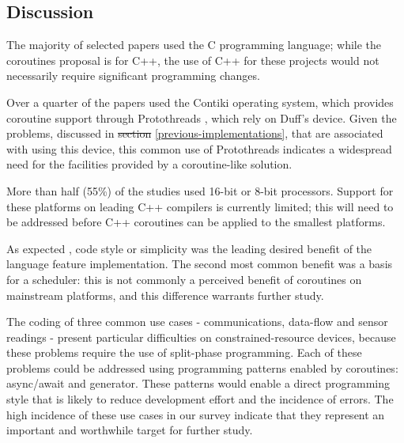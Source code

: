 \documentclass[format=acmsmall, review=false, screen=false]{acmart}
\providecommand{\DIFadd}[1]{{\protect\color{blue}\uwave{#1}}} %
\providecommand{\DIFdel}[1]{{\protect\color{red}\sout{#1}}}                      %
\providecommand{\DIFaddbegin}{} %
\providecommand{\DIFaddend}{} %
\providecommand{\DIFdelbegin}{} %
\providecommand{\DIFdelend}{} %
\newcommand{\DIFscaledelfig}{0.5}
\newlength{\DIFdelgraphicswidth} %
\newlength{\DIFdelgraphicsheight} %
\newcommand{\DIFaddincludegraphics}[2][]{{\color{blue}\fbox{\DIFOincludegraphics[#1]{#2}}}} %
\newcommand{\DIFdelincludegraphics}[2][]{%
\sbox{\DIFdelgraphicsbox}{\DIFOincludegraphics[#1]{#2}}%
\settoboxwidth{\DIFdelgraphicswidth}{\DIFdelgraphicsbox} %
\settoboxtotalheight{\DIFdelgraphicsheight}{\DIFdelgraphicsbox} %
\scalebox{\DIFscaledelfig}{%
\parbox[b]{\DIFdelgraphicswidth}{\usebox{\DIFdelgraphicsbox}\\[-\baselineskip] \rule{\DIFdelgraphicswidth}{0em}}\llap{\resizebox{\DIFdelgraphicswidth}{\DIFdelgraphicsheight}{%
\setlength{\unitlength}{\DIFdelgraphicswidth}%
\begin{picture}(1,1)%
\thicklines\linethickness{2pt} %
{\color[rgb]{1,0,0}\put(0,0){\framebox(1,1){}}}%
{\color[rgb]{1,0,0}\put(0,0){\line( 1,1){1}}}%
{\color[rgb]{1,0,0}\put(0,1){\line(1,-1){1}}}%
\end{picture}%
}\hspace*{3pt}}} %
} %
\DeclareRobustCommand{\DIFaddbegin}{\DIFOaddbegin \let\includegraphics\DIFaddincludegraphics} %
\DeclareRobustCommand{\DIFaddend}{\DIFOaddend \let\includegraphics\DIFOincludegraphics} %
\DeclareRobustCommand{\DIFdelbegin}{\DIFOdelbegin \let\includegraphics\DIFdelincludegraphics} %
\DeclareRobustCommand{\DIFdelend}{\DIFOaddend \let\includegraphics\DIFOincludegraphics} %
\begin{document}
\subsection{Discussion}

The majority of selected papers used the C programming language; while the coroutines proposal \cite{ISO2017} is for C++, the use of C++ for these projects would not necessarily require significant programming changes.

Over a quarter of the papers used the Contiki \cite{Dunkels2004} operating system, which provides coroutine support through Protothreads \cite{Dunkels2006}, which rely on Duff’s device. Given the problems, discussed in \DIFdelbegin \DIFdel{section }\DIFdelend \DIFaddbegin \DIFadd{Section }\DIFaddend \ref{previous-implementations}, that are associated with using this device, this common use of Protothreads indicates a widespread need for the facilities provided by a coroutine-like solution.

More than half (55\%) of the studies used 16-bit or 8-bit processors. Support for these platforms on leading C++ compilers is currently limited; this will need to be addressed before C++ coroutines can be applied to the smallest platforms.

As expected \cite{AspenCore2017, Skerrett2017}, code style or simplicity was the leading desired benefit of the language feature implementation. The second most common benefit was a basis for a scheduler: this is not commonly a perceived benefit of coroutines on mainstream platforms, and this difference warrants further study.

The coding of three common use cases - communications, data-flow and sensor readings - present particular difficulties on constrained-resource devices, because these problems require the use of split-phase programming. Each of these problems could be addressed using programming patterns enabled by coroutines: async/await and generator. These patterns would enable a direct programming style that is likely to reduce development effort and the incidence of errors. The high incidence of these use cases in our survey indicate that they represent an important and worthwhile target for further study.
\end{document}
